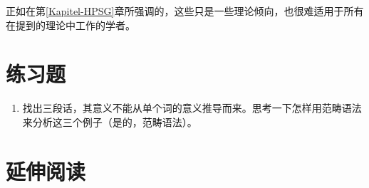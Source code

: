 正如在第\ref{Kapitel-HPSG}章所强调的，这些只是一些理论倾向，也很难适用于所有在提到的理论中工作的学者。

\section*{练习题}

\begin{enumerate}
\item 找出三段话，其意义不能从单个词的意义推导而来。思考一下怎样用范畴语法来分析这三个例子（是的，范畴语法）。
\end{enumerate}

\section*{延伸阅读} 

